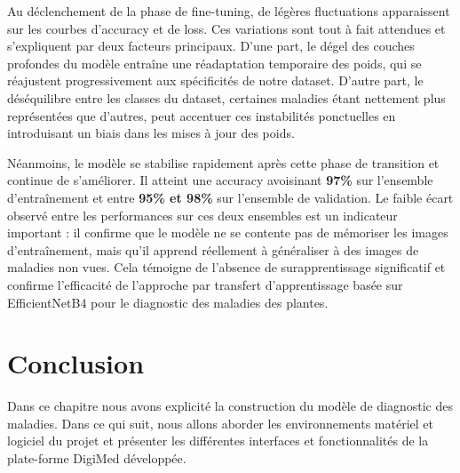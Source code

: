 Au déclenchement de la phase de fine-tuning, de légères fluctuations 
apparaissent sur les courbes d'accuracy et de loss. Ces variations sont 
tout à fait attendues et s'expliquent par deux facteurs principaux. 
D'une part, le dégel des couches profondes du modèle entraîne une 
réadaptation temporaire des poids, qui se réajustent progressivement 
aux spécificités de notre dataset. D'autre part, le déséquilibre entre 
les classes du dataset, certaines maladies étant nettement plus 
représentées que d'autres, peut accentuer ces instabilités ponctuelles 
en introduisant un biais dans les mises à jour des poids.

Néanmoins, le modèle se stabilise rapidement après cette phase de 
transition et continue de s'améliorer. Il atteint une accuracy avoisinant 
\textbf{97\%} sur l'ensemble d'entraînement et entre \textbf{95\% et 98\%} 
sur l'ensemble de validation. Le faible écart observé entre les performances 
sur ces deux ensembles est un indicateur important : il confirme que le 
modèle ne se contente pas de mémoriser les images d'entraînement, mais 
qu'il apprend réellement à généraliser à des images de maladies non vues. 
Cela témoigne de l'absence de surapprentissage significatif et confirme 
l'efficacité de l'approche par transfert d'apprentissage basée sur 
EfficientNetB4 pour le diagnostic des maladies des plantes.


\section*{Conclusion}
Dans ce chapitre nous avons explicité la construction du modèle de diagnostic des maladies. 
Dans ce qui suit, nous allons aborder les environnements matériel et logiciel du projet et présenter les différentes interfaces et
fonctionnalités de la plate-forme DigiMed développée.









